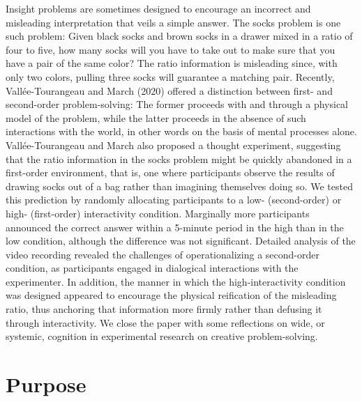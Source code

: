 \documentclass{article}
\begin{document}
Insight problems are sometimes designed to encourage an incorrect and misleading interpretation that veils a simple answer. The socks problem is one such problem: Given black socks and brown socks in a drawer mixed in a ratio of four to five, how many socks will you have to take out to make sure that you have a pair of the same color? The ratio information is misleading since, with only two colors, pulling three socks will guarantee a matching pair. Recently, Vallée-Tourangeau and March (2020) offered a distinction between first- and second-order problem-solving: The former proceeds with and through a physical model of the problem, while the latter proceeds in the absence of such interactions with the world, in other words on the basis of mental processes alone. Vallée-Tourangeau and March also proposed a thought experiment, suggesting that the ratio information in the socks problem might be quickly abandoned in a first-order environment, that is, one where participants observe the results of drawing socks out of a bag rather than imagining themselves doing so. We tested this prediction by randomly allocating participants to a low- (second-order) or high- (first-order) interactivity condition. Marginally more participants announced the correct answer within a 5-minute period in the high than in the low condition, although the difference was not significant. Detailed analysis of the video recording revealed the challenges of operationalizing a second-order condition, as participants engaged in dialogical interactions with the experimenter. In addition, the manner in which the high-interactivity condition was designed appeared to encourage the physical reification of the misleading ratio, thus anchoring that information more firmly rather than defusing it through interactivity. We close the paper with some reflections on wide, or systemic, cognition in experimental research on creative problem-solving. 



\section{Purpose }
\end{document}
